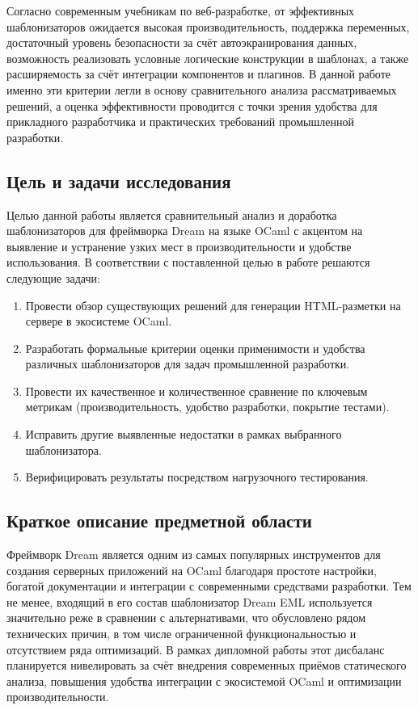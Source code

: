 Согласно современным учебникам по веб-разработке, от эффективных шаблонизаторов ожидается высокая производительность, поддержка переменных, достаточный уровень безопасности за счёт автоэкранирования данных, возможность реализовать условные логические конструкции в шаблонах, а также расширяемость за счёт интеграции компонентов и плагинов\cite{spasova2022comparison}.
В данной работе именно эти критерии легли в основу сравнительного анализа рассматриваемых решений, а оценка эффективности проводится с точки зрения удобства для прикладного разработчика и практических требований промышленной разработки.

\subsection*{Цель и задачи исследования} Целью данной работы является сравнительный анализ и доработка шаблонизаторов для фреймворка Dream на языке OCaml с акцентом на выявление и устранение узких мест в производительности и удобстве использования.
В соответствии с поставленной целью в работе решаются следующие задачи:
\begin{enumerate}
    \item Провести обзор существующих решений для генерации HTML-разметки на сервере в экосистеме OCaml.
    \item Разработать формальные критерии оценки применимости и удобства различных шаблонизаторов для задач промышленной разработки.
    \item Провести их качественное и количественное сравнение по ключевым метрикам (производительность, удобство разработки, покрытие тестами).
    \item Исправить другие выявленные недостатки в рамках выбранного шаблонизатора.
    \item Верифицировать результаты посредством нагрузочного тестирования.
\end{enumerate}

\subsection*{Краткое описание предметной области}
Фреймворк Dream является одним из самых популярных инструментов для создания серверных приложений на OCaml благодаря простоте настройки, богатой документации и интеграции с современными средствами разработки.
Тем не менее, входящий в его состав шаблонизатор Dream EML используется значительно реже в сравнении с альтернативами, что обусловлено рядом технических причин, в том числе ограниченной функциональностью и отсутствием ряда оптимизаций.
В рамках дипломной работы этот дисбаланс планируется нивелировать за счёт внедрения современных приёмов статического анализа, повышения удобства интеграции с экосистемой OCaml и оптимизации производительности.

